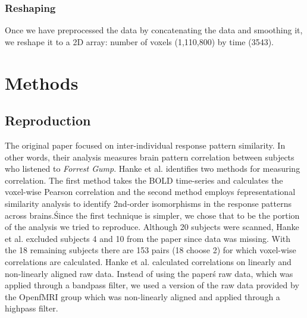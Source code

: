 \subsubsection{Reshaping}
Once we have preprocessed the data by concatenating the data and smoothing it,
we reshape it to a 2D array: number of voxels (1,110,800) by time (3543).

\section{Methods}

\subsection{Reproduction}

The original paper focused on inter-individual response pattern similarity. In
other words, their analysis measures brain pattern correlation between
subjects who listened to \emph{Forrest Gump}. Hanke et al. identifies two 
methods for measuring correlation. The first method takes the BOLD time-series 
and calculates the voxel-wise Pearson correlation and the second method employs
\'representational similarity analysis to identify 2nd-order isomorphisms in
the response patterns across brains.\' Since the first technique is simpler, we
chose that to be the portion of the analysis we tried to reproduce. Although
20 subjects were scanned, Hanke et al. excluded subjects 4 and 10 from the 
paper since data was missing. With the 18 remaining subjects there are 153 
pairs (18 choose 2) for which voxel-wise correlations are calculated. Hanke et 
al. calculated correlations on linearly and non-linearly aligned raw data. 
Instead of using the paper\'s raw data, which was applied through a bandpass 
filter, we used a version of the raw data provided by the OpenfMRI group which 
was non-linearly aligned and applied through a highpass filter.


